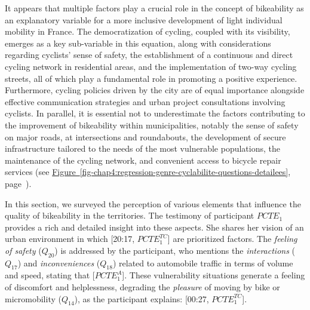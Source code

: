 \begin{refsegment}
It appears that multiple factors play a crucial role in the concept of bikeability as an explanatory variable for a more inclusive development of light individual mobility in France. The democratization of cycling, coupled with its visibility, emerges as a key sub-variable in this equation, along with considerations regarding cyclists' sense of safety, the establishment of a continuous and direct cycling network in residential areas, and the implementation of two-way cycling streets, all of which play a fundamental role in promoting a positive experience. Furthermore, cycling policies driven by the city are of equal importance alongside effective communication strategies and urban project consultations involving cyclists. In parallel, it is essential not to underestimate the factors contributing to the improvement of bikeability within municipalities, notably the sense of safety on major roads, at intersections and roundabouts, the development of secure infrastructure tailored to the needs of the most vulnerable populations, the maintenance of the cycling network, and convenient access to bicycle repair services (see \hyperref[fig-chap4:regression-genre-cyclabilite-questions-detailees]{Figure~\ref{fig-chap4:regression-genre-cyclabilite-questions-detailees}}, page~\pageref{fig-chap4:regression-genre-cyclabilite-questions-detailees}).%

In this section, we surveyed the perception of various elements that influence the quality of bikeability in the territories. The testimony of participant \(PCTE_{1}\) provides a rich and detailed insight into these aspects. She shares her vision of an urban environment in which  [20:17, \(PCTE^{TC}_{1}\)] are prioritized factors. The \textsl{feeling of safety} (\(Q_{20}\)) is addressed by the participant, who mentions the \textsl{interactions} (\(Q_{17}\)) and \textsl{inconveniences} (\(Q_{18}\)) related to automobile traffic in terms of volume and speed, stating that  [\(PCTE^{A}_{1}\)]. These vulnerability situations generate a feeling of discomfort and helplessness, degrading the \textsl{pleasure} of moving by bike or micromobility (\(Q_{14}\)), as the participant explains:  [00:27, \(PCTE^{TC}_{1}\)].%


\end{refsegment}
